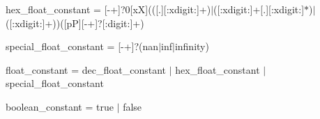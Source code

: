 hex\+\_\+float\+\_\+constant = {\ttfamily \mbox{[}-\/+\mbox{]}?0\mbox{[}xX\mbox{]}((\mbox{[}.\mbox{]}\mbox{[}\+:xdigit\+:\mbox{]}+)\texorpdfstring{$\vert$}{|}(\mbox{[}\+:xdigit\+:\mbox{]}+\mbox{[}.\mbox{]}\mbox{[}\+:xdigit\+:\mbox{]}\texorpdfstring{$\ast$}{*})\texorpdfstring{$\vert$}{|}(\mbox{[}\+:xdigit\+:\mbox{]}+))(\mbox{[}pP\mbox{]}\mbox{[}-\/+\mbox{]}?\mbox{[}\+:digit\+:\mbox{]}+)}

special\+\_\+float\+\_\+constant = {\ttfamily \mbox{[}-\/+\mbox{]}?(nan\texorpdfstring{$\vert$}{|}inf\texorpdfstring{$\vert$}{|}infinity)}

float\+\_\+constant = dec\+\_\+float\+\_\+constant \texorpdfstring{$\vert$}{|} hex\+\_\+float\+\_\+constant \texorpdfstring{$\vert$}{|} special\+\_\+float\+\_\+constant

boolean\+\_\+constant = {\ttfamily true} \texorpdfstring{$\vert$}{|} {\ttfamily false} 